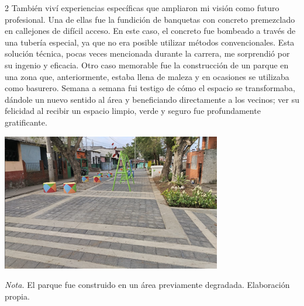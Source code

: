 \documentclass[12pt,spanish,Letterpaper,openany]{book}
\begin{document}
\begin {multicols}{2}
También viví experiencias específicas que ampliaron mi visión como futuro profesional. Una de ellas fue la fundición de banquetas con concreto premezclado en callejones de difícil acceso. En este caso, el concreto fue bombeado a través de una tubería especial, ya que no era posible utilizar métodos convencionales. Esta solución técnica, pocas veces mencionada durante la carrera, me sorprendió por su ingenio y eficacia. Otro caso memorable fue la construcción de un parque en una zona que, anteriormente, estaba llena de maleza y en ocasiones se utilizaba como basurero. Semana a semana fui testigo de cómo el espacio se transformaba, dándole un nuevo sentido al área y beneficiando directamente a los vecinos; ver su felicidad al recibir un espacio limpio, verde y seguro fue profundamente gratificante.

\begin {flushleft}
\noindent\begin{minipage}[c]{\columnwidth}

\textbf{}

\begin{center}\includegraphics[width=0.8\linewidth]{imagenes_articulos/art04_01} \end{center}

\emph{Nota.} El parque fue construido en un área previamente degradada. Elaboración propia.

\end{minipage}
\end {flushleft}

\begin {flushleft}
\noindent\begin{minipage}[c]{\columnwidth}

\textbf{}


\end{minipage}
\end{flushleft}
\end{multicols}
\end{document}
